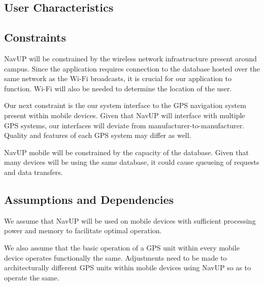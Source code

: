 \documentclass{article}
\begin{document}
    \subsection{User Characteristics}
    \subsection{Constraints}
        \begin{flushleft}
        NavUP will be constrained by the wireless network infrastructure present around campus. Since the application requires connection to the database hosted over the same network as the Wi-Fi broadcasts, it is crucial for our application to function. Wi-Fi will also be needed to determine the location of the user.
        \end{flushleft}
        
        \begin{flushleft}
        Our next constraint is the our system interface to the GPS navigation system present within mobile devices. Given that NavUP will interface with multiple GPS systems, our interfaces will deviate from manufacturer-to-manufacturer. Quality and features of each GPS system may differ as well.
        \end{flushleft}
        
        \begin{flushleft}
        NavUP mobile will be constrained by the capacity of the database. Given that many devices will be using the same database, it could cause queueing of requests and data transfers.
        \end{flushleft}
        \subsection{Assumptions and Dependencies}
        
        \begin{flushleft}
        We assume that NavUP will be used on mobile devices with sufficient processing power and memory to facilitate optimal operation.
        \end{flushleft}
        
        \begin{flushleft}
        We also assume that the basic operation of a GPS unit within every mobile device operates functionally the same. Adjustments need to be made to architecturally different GPS units within mobile devices using NavUP so as to operate the same.
        \end{flushleft}
\end{document}
